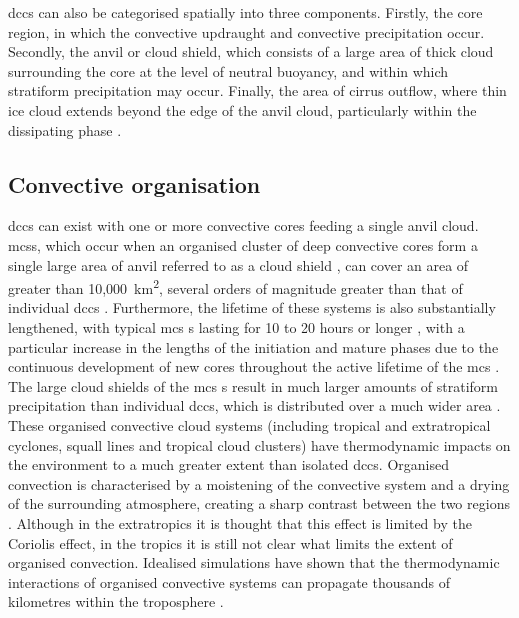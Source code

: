 \acrshort{dcc}s can also be categorised spatially into three components.
Firstly, the core region, in which the convective updraught and convective precipitation occur.
Secondly, the anvil or cloud shield, which consists of a large area of thick cloud surrounding the core at the level of neutral buoyancy, and within which stratiform precipitation may occur.
Finally, the area of cirrus outflow, where thin ice cloud extends beyond the edge of the anvil cloud, particularly within the dissipating phase \citep{lilly_cirrus_1988}.


\subsection{Convective organisation}

\acrshort{dcc}s can exist with one or more convective cores feeding a single anvil cloud.
\acrshort{mcs}s, which occur when an organised cluster of deep convective cores form a single large area of anvil referred to as a cloud shield \citep{roca_simple_2017}, can cover an area of greater than 10,000~km\textsuperscript{2}, several orders of magnitude greater than that of individual \acrshort{dcc}s \citep{houze_mesoscale_2004}.
Furthermore, the lifetime of these systems is also substantially lengthened, with typical \acrshort{mcs} s lasting for 10 to 20 hours or longer \citep{chen_diurnal_1997}, with a particular increase in the lengths of the initiation and mature phases \citep{wall_life_2018} due to the continuous development of new cores throughout the active lifetime of the \acrshort{mcs} .
The large cloud shields of the \acrshort{mcs} s result in much larger amounts of stratiform precipitation than individual \acrshort{dcc}s, which is distributed over a much wider area \citep{houze_chapter_2014}.
These organised convective cloud systems (including tropical and extratropical cyclones, squall lines and tropical cloud clusters) have thermodynamic impacts on the environment to a much greater extent than isolated \acrshort{dcc}s.
Organised convection is characterised by a moistening of the convective system and a drying of the surrounding atmosphere, creating a sharp contrast between the two regions \citep{houze_chapter_2014}.
Although in the extratropics it is thought that this effect is limited by the Coriolis effect, in the tropics it is still not clear what limits the extent of organised convection.
Idealised simulations have shown that the thermodynamic interactions of organised convective systems can propagate thousands of kilometres within the troposphere \citep{beucler_budget_2019}.

